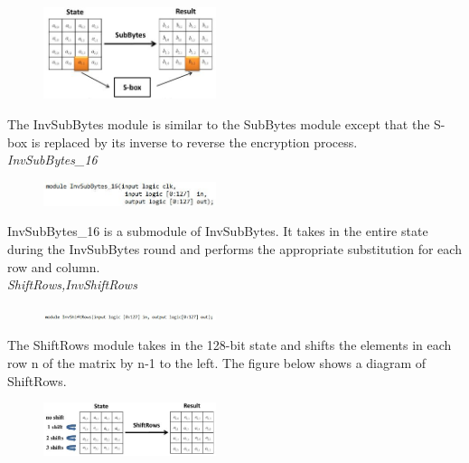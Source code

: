 \documentclass[journal, twocolumn, final,11pt,letterpaper]{IEEEtran}
\begin{document}
\begin{figure}[h]
	\centering
	\includegraphics[width=0.45\textwidth]{SubBytesdia.jpg}
	\label{fig:SubBytesdia}
\end{figure}

The InvSubBytes module is similar to the SubBytes module except that the S-box is replaced by its inverse to reverse the encryption process.  \\

\textit{InvSubBytes\_16}\\
\vspace{-4mm}

\begin{figure}[h]
	\centering
	\includegraphics[width=0.45\textwidth]{InvSubBytes_16.jpg}
	\label{fig:InvSubBytes_16}
\end{figure}


InvSubBytes\_16 is a submodule of InvSubBytes.  It takes in the entire state during the InvSubBytes round and performs the appropriate substitution for each row and column. \\

\textit{ShiftRows,InvShiftRows}\\
\vspace{-4mm}

\begin{figure}[h]
	\centering
	\includegraphics[width=0.45\textwidth]{InvShiftRows.jpg}
	\label{fig:InvShiftRows}
\end{figure}

The ShiftRows module takes in the 128-bit state and shifts the elements in each row n of the matrix by n-1 to the left.  The figure below shows a diagram of ShiftRows. \\ 

\begin{figure}[h]
	\centering
	\includegraphics[width=0.45\textwidth]{ShiftRowsdia.jpg}
	\label{fig:InvShiftRows}
\end{figure}
\end{document}
